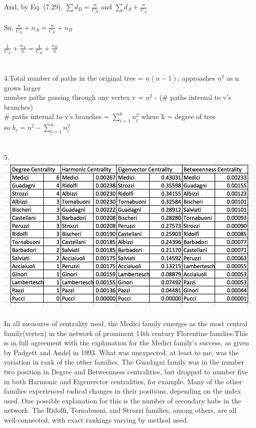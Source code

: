 \documentclass[11pt, oneside]{article}   	%
\begin{document}
\indent And, by Eq. (7.29), $\sum d_B = \frac{n}{C_B}$ and $\sum d_A+ \frac{n}{C_A}$ \\\\
\indent So, $\frac{n}{C_A} + n_A = \frac{n}{C_B} + n_B$\\\\
\indent $\frac{1}{C_A} + \frac{n_A}{n} = \frac{1}{C_B} + \frac{n_B}{n}$\\\\\\
4.Total number of paths in the original tree  = $n(n-1)$; approaches $n^2$ as n grows larger\\
\indent number paths passing through any vertex v = $n^2$ - (\# paths internal to v's branches)\\
\indent \# paths internal to v's branches = $\sum_{i=1}^{k}{n_i^2}$ where k = degree of tree\\
\indent so $b_v = n^2 - \sum_{i=1}^{k}{n_i^2}$\\\\\\
5.\\
\includegraphics[scale = .9]{mediciTable}\\\\
\indent In all measures of centrality used, the Medici family emerges as the most central family(vertex) in the network of prominent 14th century Florentine families.This is in full agreement with the explanation for the Medici family's success, as given by Padgett and Andel in 1993.  What was unexpected, at least to me, was the variation in rank of the other families.  The Guadagni family was in the number two position in Degree and Betweenness centralities, but dropped to number five in both Harmonic and Eigenvector centralities, for example.  Many of the other families experienced radical changes in their positions, depending on the index used.   One possible explanation for this is the number of secondary hubs in the network.  The Ridolfi, Tornabuoni, and Strozzi families, among others, are all well-connected, with exact rankings varying by method used.\\\\\\
\end{document}
